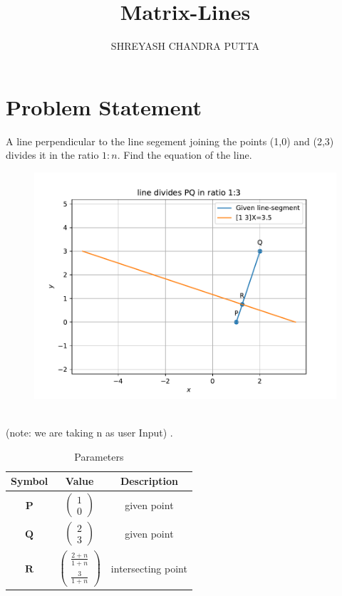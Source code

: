 \documentclass[journal,12pt,twocolumn]{article}
\title{
Matrix-Lines
}
\author{SHREYASH CHANDRA PUTTA}
\newcommand{\myvec}[1]{\ensuremath{\begin{pmatrix}#1\end{pmatrix}}}
\let\vec\mathbf
\begin{document}
\maketitle
\tableofcontents

\section{Problem Statement}
\fi
A line perpendicular to the line segement joining the points (1,0) and (2,3) divides it in the ratio $1:n$. Find the equation of the line.
	\begin{figure}[!ht]
		\centering
 \includegraphics[width=\columnwidth]{chapters/11/10/2/11/figs/linefig.pdf}
		\caption{}
		\label{fig:11/10/2/11}
  	\end{figure}
	\\
	\solution 
\iffalse
(note: we are taking n as user Input) .

% 

\begin{table}[h]
    \centering
    \begin{tabular}{|c|c|c|}
       \hline
       \textbf{Symbol}&\textbf{Value}&\textbf{Description}  \\
       \hline
	    $\vec{P}$ & $\myvec{
		    1\\
		    0}$
	    & given point\\
        \hline
	    $\vec{Q}$ & $\myvec{2\\3}$
 & given point\\
        \hline
	    $\vec{R}$ & $\myvec{
  \frac{2+n}{1+n}\\
  \frac{3}{1+n}}$
 & intersecting point  \\
       \hline
    \end{tabular}
    \caption{Parameters}
    \label{tab:my_label}
\end{table}
\end{document}
